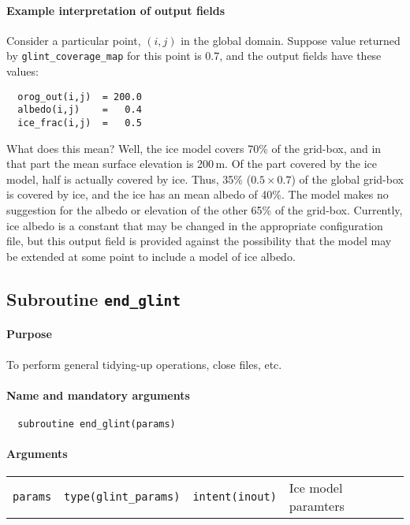 \paragraph{Example interpretation of output fields}
%
Consider a particular point, $(i,j)$ in the global domain. Suppose value
returned by \texttt{glint\_coverage\_map} for this point is 0.7, and the
output fields have these values:
\begin{verbatim}
  orog_out(i,j)  = 200.0
  albedo(i,j)    =   0.4
  ice_frac(i,j)  =   0.5
\end{verbatim}
%
What does this mean? Well, the ice model covers 70\% of the grid-box, and in
that part the mean surface elevation is 200\,m. Of the part covered by the ice
model, half is actually covered by ice. Thus, 35\% ($0.5\times 0.7$) of the global grid-box is
covered by ice, and the ice has an mean albedo of 40\%. The model makes no suggestion for the
albedo or elevation of the other 65\% of the grid-box. Currently, ice albedo
is a constant that may be changed in the appropriate configuration file, but
this output field is provided against the possibility that the model may be
extended at some point to include a model of ice albedo.
%
%
\subsection{Subroutine \texttt{end\_glint}}
%
\paragraph{Purpose} To perform general tidying-up operations, close files, etc.
%
\paragraph{Name and mandatory arguments}
%
\begin{verbatim}
  subroutine end_glint(params)
\end{verbatim}
%
\paragraph{Arguments}
%
\begin{center}
  \tablefirsthead{%
    \hline
  } 
      \tablelasttail{\hline}
        \begin{supertabular}{lllp{5.5cm}}
          \texttt{params} & \texttt{type(glint\_params)} & \texttt{intent(inout)} & Ice model paramters \\
\end{supertabular}
\end{center}
%
%

